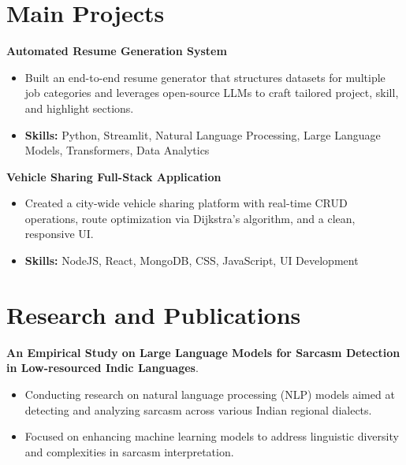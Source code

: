 \documentclass[a4paper,11pt]{article}
\begin{document}
\section{\textbf{Main Projects}}

\vspace{1mm}
  \textbf{Automated Resume Generation System  }
\vspace{-1.5mm} %
\begin{itemize}
  \item Built an end-to-end resume generator that structures datasets for multiple job categories and leverages open-source LLMs to craft tailored project, skill, and highlight sections.
\vspace{-3mm}
  \item \textbf{Skills:} Python, Streamlit, Natural Language Processing, Large Language Models, Transformers, Data Analytics
\end{itemize}


\vspace{1mm}
   \textbf{Vehicle Sharing Full-Stack Application }
\vspace{-1.5mm} %
\begin{itemize}
  \item Created a city-wide vehicle sharing platform with real-time CRUD operations, route optimization via Dijkstra's algorithm, and a clean, responsive UI.
\vspace{-3mm}
  \item \textbf{Skills:} NodeJS, React, MongoDB, CSS, JavaScript, UI Development
\end{itemize}



\section{\textbf{Research and Publications} \hfill }
\vspace{1mm}
  \textbf{An Empirical Study on Large Language Models for Sarcasm Detection in Low-resourced Indic Languages}.
\vspace{-1mm} %
\begin{itemize}
  \item Conducting research on natural language processing (NLP) models aimed at detecting and analyzing sarcasm across various Indian regional dialects.
\vspace{-3mm}
  \item Focused on enhancing machine learning models to address linguistic diversity and complexities in sarcasm interpretation.
\end{itemize}
\end{document}
